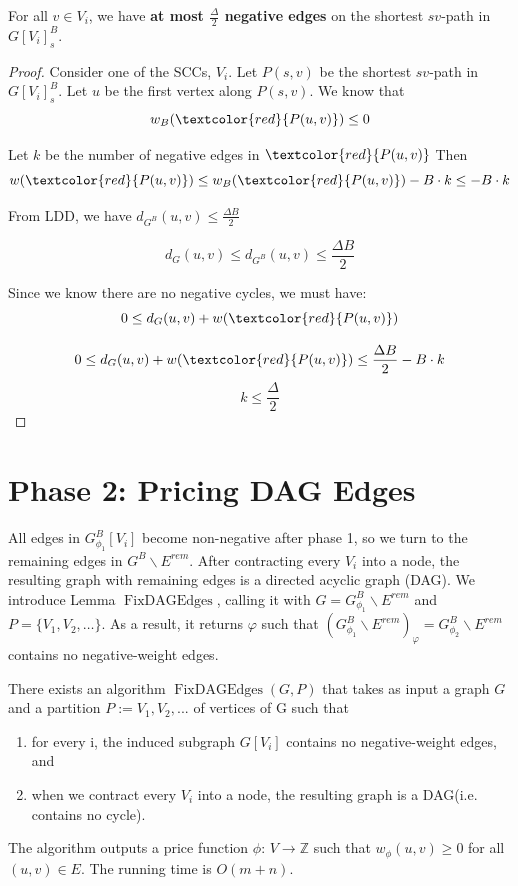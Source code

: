 \documentclass[11pt]{article}
\newcommand{\FixAlmostDag}{\operatorname{FixDAGEdges}}
\newcommand{\esep}{E^{rem}}
\newcommand{\GB}{G^{B}}
\begin{document}
\begin{lemma}
    For all $v \in V_i$, we have \textbf{at most $\frac{\Delta}{2}$ negative edges} on the shortest $sv$-path in $G[V_i]^B_s$.
\end{lemma}
\begin{proof}
Consider one of the SCCs, $V_i$. Let $P(s,v)$ be the shortest $sv$-path in $G[V_i]^B_s$. Let $u$ be the first vertex along $P(s,v)$. We know that
$$w_B(\textcolor{red}{P(u,v)}) \leq 0$$

Let $k$ be the number of negative edges in $\textcolor{red}{P(u,v)}$ Then
$$w(\textcolor{red}{P(u,v)}) \leq w_B(\textcolor{red}{P(u,v)}) -B \cdot k \leq  -B \cdot k$$

From LDD, we have $d_{\GB} (u, v) \leq  \frac{\Delta B}{2}$

   $$d_G(u,v) \leq d_{\GB} (u, v) \leq  \frac{\Delta B}{2}$$

Since we know there are no negative cycles, we must have:
  $$0 \leq d_G(u,v) + w(\textcolor{red}{P(u,v)})$$

 $$0 \leq d_G(u,v) + w(\textcolor{red}{P(u,v)}) \leq  \frac{\Delta B}{2} -B \cdot k$$
$$k \leq \frac{\Delta}{2} $$

\end{proof}

    
\section{Phase 2: Pricing DAG Edges}
All edges in $G^B_{\phi_1}[V_i]$ become non-negative after phase 1, so we turn to the remaining edges in $G^B \backslash \esep$. After contracting every $V_i$ into a node, the resulting graph with remaining edges is a directed acyclic graph (DAG). We introduce Lemma $\FixAlmostDag$, calling it with $G=G^B_{\phi_1} \backslash \esep$ and $P = \{V_1, V_2, \dots\}$. As a result, it returns $\varphi$ such that $(G^B_{\phi_1} \backslash \esep)_\varphi = G^B_{\phi_2} \backslash \esep$ contains no negative-weight edges.

\begin{lemma}
There exists an algorithm $\FixAlmostDag(G, P)$ that takes as input a graph $G$ and a partition $P := {V_1, V_2, ...}$ of vertices of G such that
\begin{enumerate}
    \item for every i, the induced subgraph $G[V_i]$ contains no negative-weight edges, and
    \item when we contract every $V_i$ into a node, the resulting graph is a DAG(i.e. contains no cycle).
\end{enumerate}
The algorithm outputs a price function $\phi$: $V \to \mathbb{Z}$ such that $w_\phi(u, v) \ge 0$ for all $(u, v) \in E$. The running time is $O(m+n)$.
\end{lemma}
\end{document}

